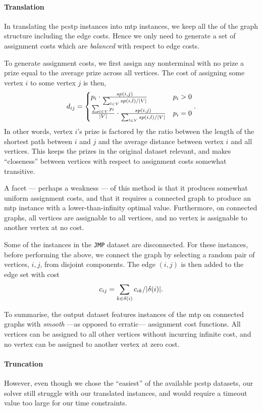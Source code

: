  \paragraph{Translation}
 In translating the \gls{pcstp} instances into \gls{mtp} instances, we keep all the of the graph
 structure including the edge costs. Hence we only need to generate a set of assignment costs which
 are \textit{balanced} with respect to edge costs.

 To generate assignment costs, we first assign any nonterminal with no prize a prize
 equal to the average prize across all vertices. The cost of assigning some vertex $i$
 to some vertex $j$ is then,
 $$d_{ij} =
 \begin{cases}
   p_i \cdot \frac{sp(i, j)}{\sum_{l \in V}sp(i,l) / |V|} & p_i > 0 \\
      \frac{\sum_{l \in V} p_l}{|V|} \cdot \frac{sp(i, j)}{\sum_{l \in V}sp(i,l) / |V|} & p_i = 0
 \end{cases}\mathnormal{.}
$$
In other words, vertex $i$'s prize is factored by the ratio between the
length of the shortest path
between $i$ and $j$ and the
average distance between vertex $i$ and all vertices.
This keeps the prizes in the original dataset relevant, and makes ``closeness'' between
vertices with respect to assignment costs somewhat transitive.

 A facet --- perhaps a weakness --- of this method is that it produces somewhat uniform
 assignment costs, and that it requires a connected graph to produce an \gls{mtp} instance
 with a lower-than-infinity optimal value. Furthermore, on connected graphs, all vertices
 are assignable to all vertices, and no vertex is assignable to another vertex at no cost.

 Some of the instances in the \texttt{JMP} dataset are disconnected. For these instances,
 before performing the above, we connect the graph by selecting a random pair of vertices,
 $i,j$, from disjoint components. The edge $(i,j)$ is then added to the edge set with cost
 \[c_{ij} = \sum_{k \in \delta(i)} c_{ik} / |\delta(i)|\mathnormal{.}\]

 To summarise, the output dataset features instances of the \gls{mtp}
 on connected graphs with
 \textit{smooth}
 ---as opposed to erratic---
 assignment cost functions.
 All vertices
 can be assigned to all other vertices without incurring infinite cost,
 and no vertex
 can be assigned to another vertex at zero cost. 

 \paragraph{Truncation} However, even though we chose the ``easiest'' of the available
 \gls{pcstp} datasets,
 our solver still struggle with our translated instances, and would require a timeout
 value too large for our time constraints.


